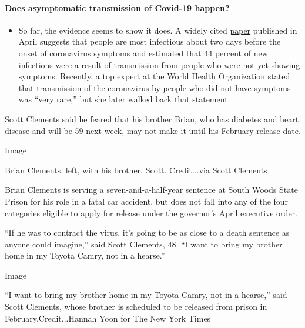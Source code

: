\begin{itemize}
{  \paragraph{Does asymptomatic transmission of Covid-19
  happen?}\label{does-asymptomatic-transmission-of-covid-19-happen}}

  \begin{itemize}
  \tightlist
  \item
    So far, the evidence seems to show it does. A widely cited
    \href{https://www.nature.com/articles/s41591-020-0869-5}{paper}
    published in April suggests that people are most infectious about
    two days before the onset of coronavirus symptoms and estimated that
    44 percent of new infections were a result of transmission from
    people who were not yet showing symptoms. Recently, a top expert at
    the World Health Organization stated that transmission of the
    coronavirus by people who did not have symptoms was ``very rare,''
    \href{https://www.nytimes.com/2020/06/09/world/coronavirus-updates.html?action=click\&pgtype=Article\&state=default\&region=MAIN_CONTENT_3\&context=storylines_faq\#link-1f302e21}{but
    she later walked back that statement.}
  \end{itemize}
\end{itemize}

Scott Clements said he feared that his brother Brian, who has diabetes
and heart disease and will be 59 next week, may not make it until his
February release date.

Image

Brian Clements, left, with his brother, Scott. Credit...via Scott
Clements

Brian Clements is serving a seven-and-a-half-year sentence at South
Woods State Prison for his role in a fatal car accident, but does not
fall into any of the four categories eligible to apply for release under
the governor's April executive
\href{https://www.nj.gov/governor/news/news/562020/20200410d.shtml}{order}.

``If he was to contract the virus, it's going to be as close to a death
sentence as anyone could imagine,'' said Scott Clements, 48. ``I want to
bring my brother home in my Toyota Camry, not in a hearse.''

Image

``I want to bring my brother home in my Toyota Camry, not in a hearse,''
said Scott Clements, whose brother is scheduled to be released from
prison in February.Credit...Hannah Yoon for The New York Times

